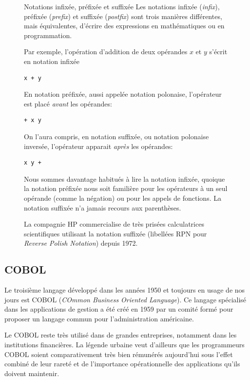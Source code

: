 \begin{figure}[t]
  \label{fig:informatique:notations}
  \setlength{\FrameRule}{1pt}
  \begin{emphbox}{\mdseries Notations infixée, préfixée et suffixée}
    Les notations infixée (\emph{infix}), préfixée (\emph{prefix}) et
    suffixée (\emph{postfix}) sont trois manières différentes, mais
    équivalentes, d'écrire des expressions en mathématiques ou en
    programmation.

    Par exemple, l'opération d'addition de deux opérandes $x$ et $y$
    s'écrit en notation infixée
\begin{lstlisting}
x + y
\end{lstlisting}
    En notation préfixée, aussi appelée notation polonaise,
    l'opérateur est placé \emph{avant} les opérandes:
\begin{lstlisting}
+ x y
\end{lstlisting}
    On l'aura compris, en notation suffixée, ou notation polonaise
    inversée, l'opérateur apparait \emph{après} les opérandes:
\begin{lstlisting}
x y +
\end{lstlisting}
    Nous sommes davantage habitués à lire la notation infixée, quoique
    la notation préfixée nous soit familière pour les opérateurs à un
    seul opérande (comme la négation) ou pour les appels de fonctions.
    La notation suffixée n'a jamais recours aux parenthèses.

    La compagnie HP commercialise de très prisées calculatrices
    scientifiques utilisant la notation suffixée (libellées RPN pour
    \emph{Reverse Polish Notation}) depuis 1972.
  \end{emphbox}
\end{figure}

\subsection{COBOL}
\label{sec:informatique:historique:cobol}

Le troisième langage développé dans les années 1950 et toujours en
usage de nos jours est COBOL (\emph{COmmon Business Oriented
  Language}). Ce langage spécialisé dans les applications de gestion a
été créé en 1959 par un comité formé pour proposer un langage commun
pour l'administration américaine.

Le COBOL reste très utilisé dans de grandes entreprises, notamment
dans les institutions financières. La légende urbaine veut d'ailleurs
que les programmeurs COBOL soient comparativement très bien rémunérés
aujourd'hui sous l'effet combiné de leur rareté et de l'importance
opérationnelle des applications qu'ils doivent maintenir.

